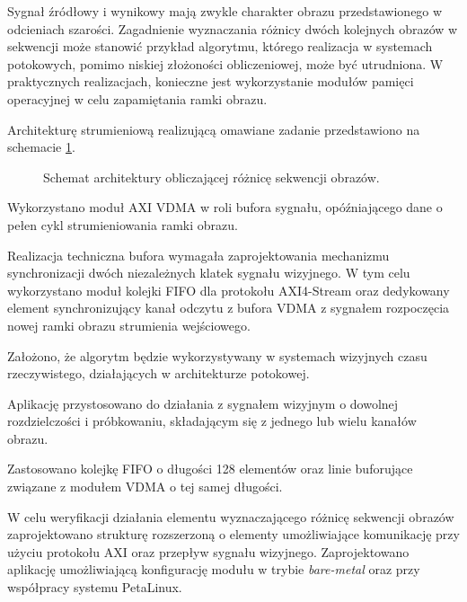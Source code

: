 Sygnał źródłowy i wynikowy  mają zwykle charakter obrazu przedstawionego w odcieniach szarości. %
Zagadnienie wyznaczania różnicy dwóch kolejnych obrazów w sekwencji może stanowić przykład algorytmu, którego realizacja w systemach potokowych, pomimo niskiej złożoności obliczeniowej, może być utrudniona. %
W praktycznych realizacjach, konieczne jest wykorzystanie modułów pamięci operacyjnej w celu zapamiętania ramki obrazu. %

Architekturę strumieniową realizującą omawiane zadanie przedstawiono na schemacie \ref{fig:frame-difference}.

\begin{figure}[h]
	\centering
	\def\svgwidth{\textwidth}
	
	\caption{Schemat architektury obliczającej różnicę sekwencji obrazów.}
	\label{fig:frame-difference}
\end{figure}

Wykorzystano moduł AXI VDMA w roli bufora sygnału, opóźniającego dane o pełen cykl strumieniowania ramki obrazu.

Realizacja techniczna bufora wymagała zaprojektowania mechanizmu synchronizacji dwóch niezależnych klatek sygnału wizyjnego. 
W tym celu wykorzystano moduł kolejki FIFO dla protokołu AXI4-Stream oraz dedykowany element synchronizujący kanał odczytu z bufora VDMA z sygnałem rozpoczęcia nowej ramki obrazu strumienia wejściowego. %

Założono, że algorytm będzie wykorzystywany w systemach wizyjnych czasu rzeczywistego, działających w architekturze potokowej. 

Aplikację przystosowano do działania z sygnałem wizyjnym o dowolnej rozdzielczości i próbkowaniu, składającym się z jednego lub wielu kanałów obrazu.

Zastosowano kolejkę FIFO o długości 128 elementów oraz linie buforujące związane z modułem VDMA o tej samej długości.

W celu weryfikacji działania elementu wyznaczającego różnicę sekwencji obrazów zaprojektowano strukturę rozszerzoną o elementy umożliwiające komunikację przy użyciu protokołu AXI oraz przepływ sygnału wizyjnego. 
Zaprojektowano aplikację umożliwiającą konfigurację modułu w trybie \textit{bare-metal} oraz przy współpracy systemu PetaLinux.


